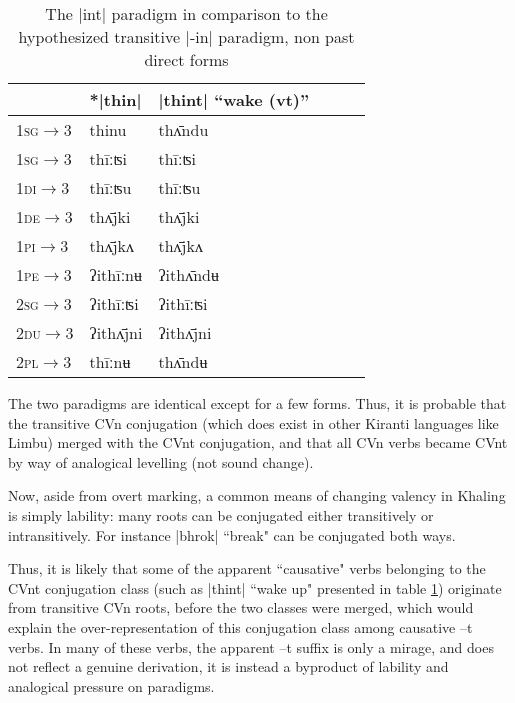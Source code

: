 \documentclass[oldfontcommands,oneside,a4paper,11pt]{article}
\newcommand{\ipa}[1]{{\phon #1}} %
\newcommand{\grise}[1]{\cellcolor{lightgray}\textbf{#1}}
\newcommand{\dhatu}[1]{|\ipa{#1}|}
\begin{document}
\begin{table}[h]
\caption{The \dhatu{int} paradigm in comparison to the hypothesized transitive |-in| paradigm, non past direct forms} \label{tab:int} \centering
\begin{tabular}{llllll}
\toprule
\textsc{} &	*\dhatu{thin}  &  	\dhatu{thint} ``wake (vt)''  \\  		
\midrule
\textsc{1sg$\rightarrow$3} &	\ipa{*thinu} \grise{}  &  	\ipa{thʌ̄ndu}  \\  		
\textsc{1sg$\rightarrow$3} &	\ipa{thīːʦi}  &  	\ipa{thīːʦi}  \\  		
\textsc{1di$\rightarrow$3} &	\ipa{thīːʦu}  &  	\ipa{thīːʦu}  \\  		
\textsc{1de$\rightarrow$3} &	\ipa{thʌ̄jki}  &  	\ipa{thʌ̄jki}  \\  		
\textsc{1pi$\rightarrow$3} &	\ipa{thʌ̄jkʌ}  &  	\ipa{thʌ̄jkʌ}  \\  		
\textsc{1pe$\rightarrow$3} &	\ipa{*ʔithīːnʉ}\grise{}   &  	\ipa{ʔithʌ̄ndʉ}  \\  		
\textsc{2sg$\rightarrow$3} &	\ipa{ʔithīːʦi}  &  	\ipa{ʔithīːʦi}  \\  		
\textsc{2du$\rightarrow$3} &	\ipa{ʔithʌ̄jni}  &  	\ipa{ʔithʌ̄jni}  \\  		
\textsc{2pl$\rightarrow$3} &	\ipa{*thīːnʉ}\grise{}   &  	\ipa{thʌ̄ndʉ}  \\  		
\bottomrule
\end{tabular}
\end{table}
The two paradigms are identical except for a few forms. Thus, it is probable that the transitive CVn conjugation (which does exist in other Kiranti languages like Limbu) merged with the CVnt conjugation, and that all CVn verbs became CVnt by way of analogical levelling (not sound change).

Now, aside from overt marking, a common means of changing valency in Khaling is simply lability: many roots can be conjugated either transitively or intransitively. For instance \dhatu{bhrok} ``break" can be conjugated both ways. 


Thus, it is likely that some of the apparent ``causative" verbs belonging to the CVnt conjugation class (such as \dhatu{thint} ``wake up" presented in table \ref{tab:int}) originate from transitive CVn roots, before the two classes were merged, which would explain the over-representation of this conjugation class among causative \ipa{--t} verbs. In many of these verbs, the apparent --t suffix is only a mirage, and does not reflect a genuine derivation, it is instead a byproduct of lability and analogical pressure on paradigms.
\end{document}

